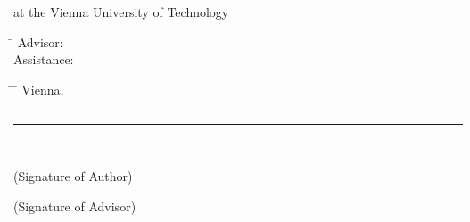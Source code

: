 \begin{otherlanguage}{english}
\begin{center}
\begin{minipage}[t][1.6cm][t]{\textwidth}
  at the Vienna University of Technology
\end{minipage}

\end{center}

\begin{minipage}[t][4cm][t]{\textwidth}%
  \vspace{0pt}\raggedright\thesistitlefontnormalsize\sffamily
  \begin{tabbing}%
	    \hspace{19mm} \= \hspace{66mm} \kill
	    Advisor: \> \tuinfthesisbetreins\\
	    \ifAssistance
	    Assistance: \> \tuinfthesisbetrzwei\\
	                \> \tuinfthesisbetrdrei
	    \fi
     \end{tabbing}
\end{minipage}

\begin{minipage}[t][1.5cm][t]{\textwidth}%
  \vspace{0pt}\sffamily\thesistitlefontnormalsize
  \begin{tabbing}%
    \hspace{45mm} \= \hspace{63mm} \= \hspace{51mm} \kill
    Vienna, \tuinfthesisdate \> {\raggedright\rule{51mm}{0.5pt}} \> {\raggedright\rule{51mm}{0.5pt}} \\
    \> \begin{minipage}[t][0.5cm][t]{51mm}\centering (Signature of Author)\end{minipage}
    \> \begin{minipage}[t][0.5cm][t]{51mm}\centering (Signature of Advisor)\end{minipage}
    \end{tabbing}
\end{minipage}

\end{otherlanguage}




\restoregeometry



